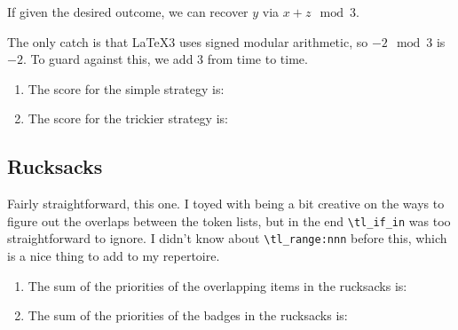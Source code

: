 \documentclass{article}
\begin{document}
If given the desired outcome, we can recover \(y\) via \(x + z \mod 3\).

The only catch is that \LaTeX3 uses signed modular arithmetic, so \(-2 \mod 3\) is \(-2\).
To guard against this, we add \(3\) from time to time.

\begin{enumerate}
\item The score for the simple strategy is: 
\item The score for the trickier strategy is: 
\end{enumerate}

\subsection{Rucksacks}

Fairly straightforward, this one.
I toyed with being a bit creative on the ways to figure out the overlaps between the token lists, but in the end \Verb!\tl_if_in! was too straightforward to ignore.
I didn't know about \Verb!\tl_range:nnn! before this, which is a nice thing to add to my repertoire.

\begin{enumerate}
\item The sum of the priorities of the overlapping items in the rucksacks is: 
\item The sum of the priorities of the badges in the rucksacks is: 
\end{enumerate}
\end{document}

